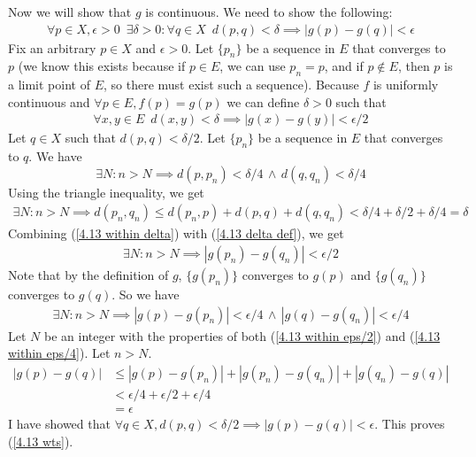 \documentclass[11pt,letterpaper]{article}
\begin{document}
Now we will show that $g$ is continuous. We need to show the following:
\begin{align}\label{4.13 wts} \forall p \in X, \epsilon>0 \,\,\, \exists \delta>0 : \forall q \in X \,\,\, d(p,q)<\delta \implies |g(p)-g(q)|<\epsilon \end{align}
Fix an arbitrary $p \in X$ and $\epsilon>0$. Let $\{p_n\}$ be a sequence in $E$ that converges to $p$ (we know this exists because if $p \in E$, we can use $p_n=p$, and if $p \notin E$, then $p$ is a limit point of $E$, so there must exist such a sequence). 
Because $f$ is uniformly continuous and $\forall p \in E, f(p)=g(p)$ we can define $\delta>0$ such that
\begin{align}\label{4.13 delta def} \forall x,y \in E \,\,\, d(x,y)<\delta \implies |g(x)-g(y)|<\epsilon/2 \end{align}
Let $q \in X$ such that $d(p,q) < \delta/2$. Let $\{p_n\}$ be a sequence in $E$ that converges to $q$. We have
\[ \exists N : n>N \implies d(p,p_n)<\delta/4 \,\land\, d(q,q_n)<\delta/4 \]
Using the triangle inequality, we get
\begin{align}\label{4.13 within delta} \exists N : n>N \implies d(p_n,q_n) \leq d(p_n,p)+d(p,q)+d(q,q_n)<\delta/4 + \delta/2 + \delta/4 = \delta \end{align}
Combining (\ref{4.13 within delta}) with (\ref{4.13 delta def}), we get
\begin{align}\label{4.13 within eps/2} \exists N : n>N \implies |g(p_n)-g(q_n)|<\epsilon/2 \end{align}
Note that by the definition of $g$, $\{g(p_n)\}$ converges to $g(p)$ and $\{g(q_n)\}$ converges to $g(q)$. So we have
\begin{align}\label{4.13 within eps/4} \exists N : n>N \implies |g(p)-g(p_n)|<\epsilon/4 \,\land\, |g(q)-g(q_n)|<\epsilon/4 \end{align}
Let $N$ be an integer with the properties of both (\ref{4.13 within eps/2}) and (\ref{4.13 within eps/4}). Let $n > N$.
\begin{align*}
|g(p)-g(q)| &\leq |g(p)-g(p_n)| + |g(p_n)-g(q_n)| + |g(q_n)-g(q)| \\
&< \epsilon/4 + \epsilon/2 + \epsilon/4 \\
&= \epsilon
\end{align*}
I have showed that $\forall q \in X, d(p,q)<\delta/2 \implies |g(p)-g(q)|<\epsilon$. This proves (\ref{4.13 wts}).
\end{document}
